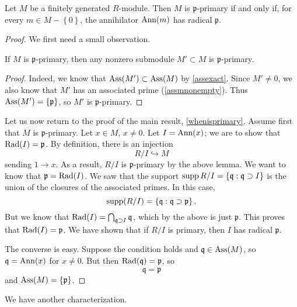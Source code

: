 \begin{proposition} \label{whenisprimary}
Let $M$ be a finitely generated $R$-module. Then $M$ is \textbf{$\mathfrak{p}$}-primary if
and only if, for every $m \in M - \left\{0\right\}$, 
the annihilator $\operatorname{Ann}(m)$ has radical $\mathfrak{p}$.
\end{proposition} 
\begin{proof} 
We first need a small observation.

\begin{lemma} 
If $M$ is $\mathfrak{p}$-primary, then any nonzero submodule $M' \subset M$ is
$\mathfrak{p}$-primary.
\end{lemma} 
\begin{proof} 
Indeed, we know that $\operatorname{Ass}(M') \subset \operatorname{Ass}(M)$ by \cref{assexact}.
Since $M' \neq 0$, we also know that $M'$ has an associated prime
(\cref{assmnonempty}). Thus $ \operatorname{Ass}(M') = \{\mathfrak{p}\}$, so
$M'$ is $\mathfrak{p}$-primary.
\end{proof} 

Let us now return to the proof of the main result,
\cref{whenisprimary}.
Assume first that $M$ is $\mathfrak{p}$-primary. Let $x \in M$, $x \neq 0$. Let
$I = \operatorname{Ann}(x)$; we are to show that $\operatorname{Rad}(I)  =\mathfrak{p}$. By definition, there is an injection
\[ R/I \hookrightarrow M  \]
sending $1 \to x$. As a result, $R/I$ is $\mathfrak{p}$-primary by the above
lemma. We want to know that $\mathfrak{p}  = \operatorname{Rad}(I)$. 
We saw that the support $\operatorname{supp} R/I = \left\{\mathfrak{q}: \mathfrak{q}
\supset I\right\}$ is the union of the closures of the associated primes. In
this case, 
\[ \operatorname{supp}(R/I) = \left\{\mathfrak{q}: \mathfrak{q} \supset \mathfrak{p}\right\}
.\]
But we know that $\operatorname{Rad}(I) = \bigcap_{\mathfrak{q} \supset I} \mathfrak{q}$,
which by the above is just $\mathfrak{p}$. This proves that $\operatorname{Rad}(I) =
\mathfrak{p}$.
We have shown that if $R/I$ is primary, then $I$ has radical $\mathfrak{p}$.

The converse is easy. 
Suppose the condition holds and $\mathfrak{q} \in \operatorname{Ass}(M)$, so $\mathfrak{q} =
\operatorname{Ann}(x)$ for $x \neq 0$. But then $\operatorname{Rad}(\mathfrak{q}) = \mathfrak{p}$, so 
\[ \mathfrak{q} = \mathfrak{p}  \] and $\operatorname{Ass}(M) = \left\{\mathfrak{p}\right\}$.
\end{proof} 

We have another characterization.

